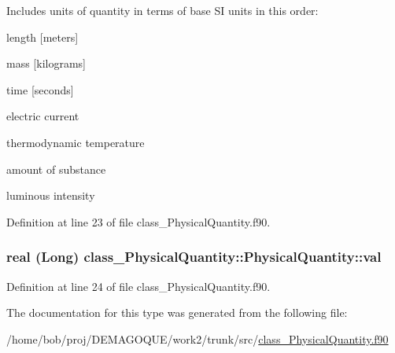 Includes units of quantity in terms of base SI units in this order: 


\begin{DoxyEnumerate}
\item length \mbox{[}meters\mbox{]}
\item mass \mbox{[}kilograms\mbox{]}
\item time \mbox{[}seconds\mbox{]}
\item electric current
\item thermodynamic temperature
\item amount of substance
\item luminous intensity 
\end{DoxyEnumerate}

Definition at line 23 of file class\_\-PhysicalQuantity.f90.

\hypertarget{typeclass__PhysicalQuantity_1_1PhysicalQuantity_ae362510ba84f98322e31cd40193a4d26}{
\subsubsection[{val}]{\setlength{\rightskip}{0pt plus 5cm}real (Long) {\bf class\_\-PhysicalQuantity::PhysicalQuantity::val}}}
\label{typeclass__PhysicalQuantity_1_1PhysicalQuantity_ae362510ba84f98322e31cd40193a4d26}


Definition at line 24 of file class\_\-PhysicalQuantity.f90.



The documentation for this type was generated from the following file:\begin{DoxyCompactItemize}
\item 
/home/bob/proj/DEMAGOQUE/work2/trunk/src/\hyperlink{class__PhysicalQuantity_8f90}{class\_\-PhysicalQuantity.f90}\end{DoxyCompactItemize}
